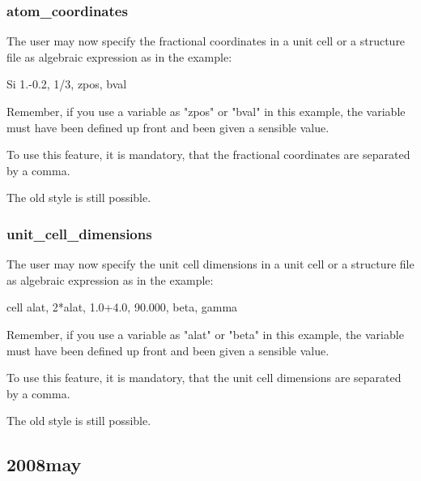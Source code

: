 \subsubsection{atom\_coordinates}
\par
The user may now specify the fractional coordinates in a unit cell 
or a structure file as algebraic expression as in the example: 
\par
Si   1.-0.2, 1/3, zpos, bval 
\par
Remember, if you use a variable as "zpos" or "bval" in this example, 
the variable must have been defined up front and been given a 
sensible value. 
\par
To use this feature, it is mandatory, that the fractional coordinates 
are separated by a comma. 
\par
The old style is still possible. 
\par
\subsubsection{unit\_cell\_dimensions}
\par
The user may now specify the unit cell dimensions  in a unit cell 
or a structure file as algebraic expression as in the example: 
\par
cell alat, 2*alat, 1.0+4.0, 90.000, beta, gamma 
\par
Remember, if you use a variable as "alat" or "beta" in this example, 
the variable must have been defined up front and been given a 
sensible value. 
\par
To use this feature, it is mandatory, that the unit cell dimensions 
are separated by a comma. 
\par
\par
The old style is still possible. 
\subsection*{2008may}
